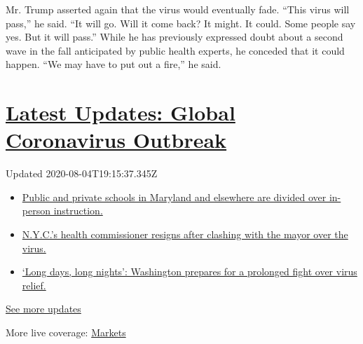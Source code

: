 Mr. Trump asserted again that the virus would eventually fade. ``This
virus will pass,'' he said. ``It will go. Will it come back? It might.
It could. Some people say yes. But it will pass.'' While he has
previously expressed doubt about a second wave in the fall anticipated
by public health experts, he conceded that it could happen. ``We may
have to put out a fire,'' he said.

\hypertarget{latest-updates-global-coronavirus-outbreak}{%
\section{\texorpdfstring{\href{https://www.nytimes.com/2020/08/04/world/coronavirus-cases.html?action=click\&pgtype=Article\&state=default\&region=MAIN_CONTENT_1\&context=storylines_live_updates}{Latest
Updates: Global Coronavirus
Outbreak}}{Latest Updates: Global Coronavirus Outbreak}}\label{latest-updates-global-coronavirus-outbreak}}

Updated 2020-08-04T19:15:37.345Z

\begin{itemize}
\tightlist
\item
  \href{https://www.nytimes.com/2020/08/04/world/coronavirus-cases.html?action=click\&pgtype=Article\&state=default\&region=MAIN_CONTENT_1\&context=storylines_live_updates\#link-4825b93}{Public
  and private schools in Maryland and elsewhere are divided over
  in-person instruction.}
\item
  \href{https://www.nytimes.com/2020/08/04/world/coronavirus-cases.html?action=click\&pgtype=Article\&state=default\&region=MAIN_CONTENT_1\&context=storylines_live_updates\#link-4d1eafa8}{N.Y.C.'s
  health commissioner resigns after clashing with the mayor over the
  virus.}
\item
  \href{https://www.nytimes.com/2020/08/04/world/coronavirus-cases.html?action=click\&pgtype=Article\&state=default\&region=MAIN_CONTENT_1\&context=storylines_live_updates\#link-6b644638}{`Long
  days, long nights': Washington prepares for a prolonged fight over
  virus relief.}
\end{itemize}

\href{https://www.nytimes.com/2020/08/04/world/coronavirus-cases.html?action=click\&pgtype=Article\&state=default\&region=MAIN_CONTENT_1\&context=storylines_live_updates}{See
more updates}

More live coverage:
\href{https://www.nytimes.com/live/2020/08/04/business/stock-market-today-coronavirus?action=click\&pgtype=Article\&state=default\&region=MAIN_CONTENT_1\&context=storylines_live_updates}{Markets}

